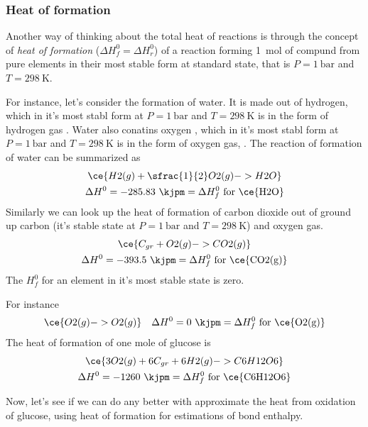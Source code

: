 \documentclass[../mit-general-chemistry.tex]{subfiles}
\begin{document}
\subsubsection{Heat of formation}

Another way of thinking about the total heat of reactions is through
the concept of {\em heat of formation} ($\Delta H_f^0 = \Delta H_r^0$)
of a reaction forming \SI{1}{\mol} of compund from pure elements in
their most stable form at standard state, that is $P = \SI{1}{\bar}$
and $T = \SI{298}{\kelvin}$.

For instance, let's consider the formation of water. It is made out of
hydrogen, which in it's most stabl form at $P = \SI{1}{\bar}$ and $T =
\SI{298}{\kelvin}$ is in the form of hydrogen gas . Water also
conatins oxygen , which in it's most stabl form at $P = \SI{1}{\bar}$
and $T = \SI{298}{\kelvin}$ is in the form of oxygen gas, . The
reaction of formation of water can be summarized as
\begin{multline*}
  \ce{H2(g) + \sfrac{1}{2} O2(g) -> H2O} \\
  \Delta H^0 = -285.83~\kjpm = \Delta H_f^0~\text{for \ce{H2O}}
\end{multline*}
Similarly we can look up the heat of formation of carbon dioxide out
of ground up carbon (it's stable state at $P = \SI{1}{\bar}$ and $T =
\SI{298}{\kelvin}$) and oxygen gas.
\begin{multline*}
  \ce{C_{gr} + O2(g) -> CO2(g)} \\
  \Delta H^0 = -393.5~\kjpm = \Delta H_f^0~\text{for \ce{CO2(g)}}
\end{multline*}
The $H_f^0$ for an element in it's most stable state is zero.

For instance
\begin{align*}
  &\ce{O2(g) -> O2(g)}
  &\Delta H^0 = 0~\kjpm = \Delta H_f^0~\text{for \ce{O2(g)}} \\
\end{align*}
The heat of formation of one mole of glucose is
\begin{multline*}
  \ce{3O2(g) + 6C_{gr} + 6H2(g) -> C6H12O6} \\
  \Delta H^0 = -1260~\kjpm = \Delta H_f^0~\text{for \ce{C6H12O6}} \\
\end{multline*}


Now, let's see if we can do any better with approximate the heat from
oxidation of glucose, using heat of formation for estimations of bond
enthalpy.
\end{document}
